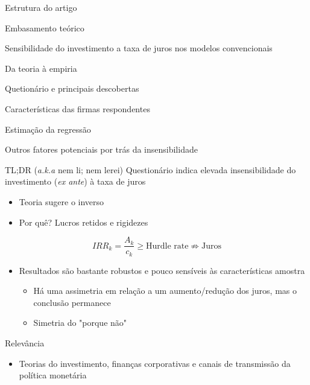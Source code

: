 \documentclass[presentation]{beamer}
\begin{document}
\begin{frame}[label={sec:org0e0013f}]{Estrutura do artigo}
\begin{block}{Embasamento teórico}
\begin{block}{Sensibilidade do investimento a taxa de juros nos modelos convencionais}
\end{block}
\begin{block}{Da teoria à empiria}
\end{block}
\end{block}
\begin{block}{Quetionário e principais descobertas}
\end{block}
\begin{block}{Características das firmas respondentes}
\end{block}
\begin{block}{Estimação da regressão}
\end{block}
\begin{block}{Outros fatores potenciais por trás da insensibilidade}
\end{block}
\end{frame}
\begin{frame}[label={sec:org4c84397}]{TL;DR (\emph{a.k.a} nem li; nem lerei)}
Questionário indica elevada \alert{insensibilidade} do investimento (\emph{ex ante}) à taxa de juros
\begin{itemize}
\item Teoria sugere o inverso
\item Por quê? Lucros retidos e rigidezes
\end{itemize}

$$
IRR_{k} = \frac{A_{k}}{c_{k}} \geq \text{Hurdle rate} \nRightarrow \text{Juros}
$$

\begin{itemize}
\item Resultados são bastante robustos e pouco sensíveis às características amostra
\begin{itemize}
\item Há uma assimetria em relação a um aumento/redução dos juros, mas o conclusão permanece
\item Simetria do "porque não"
\end{itemize}
\end{itemize}

\begin{block}{Relevância}
\begin{itemize}
\item Teorias do investimento, finanças corporativas e canais de transmissão da política monetária
\end{itemize}
\end{block}
\end{frame}
\end{document}
